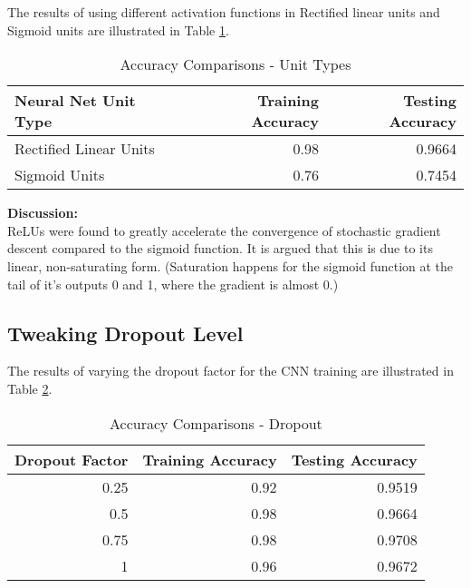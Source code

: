 \documentclass[parskip=half]{scrartcl}
\begin{document}
        The results of using different activation functions in Rectified linear units and Sigmoid units are illustrated in Table \ref{tab:accuracy_comparisons_unit_types}.

        \begin{table}[th]
            \centering
            \begin{tabular}{| l | r | r |}
            \hline
            \textbf{Neural Net Unit Type} & \textbf{Training Accuracy} & \textbf{Testing Accuracy} \\
            \hline
                \hline
                Rectified Linear Units & 0.98 & 0.9664 \\
                \hline
                Sigmoid Units & 0.76 & 0.7454 \\
            \hline
            \end{tabular}
            \caption{Accuracy Comparisons - Unit Types}
            \label{tab:accuracy_comparisons_unit_types}
        \end{table}

        \textbf{Discussion:}\\
        ReLUs were found to greatly accelerate the convergence of stochastic gradient descent compared to the sigmoid function. It is argued that this is due to its linear, non-saturating form. (Saturation happens for the sigmoid function at the tail of it's outputs 0 and 1, where the gradient is almost 0.)
    

    \subsection{Tweaking Dropout Level} %
    \label{sub:tweaking_dropout_level}

        The results of varying the dropout factor for the CNN training are illustrated in Table \ref{tab:accuracy_comparisons_dropout}.

        \begin{table}[th]
            \centering
            \begin{tabular}{| r | r | r |}
            \hline
            \textbf{Dropout Factor} & \textbf{Training Accuracy} & \textbf{Testing Accuracy} \\
            \hline
                \hline
                0.25 & 0.92 & 0.9519 \\
                \hline
                0.5 & 0.98 & 0.9664 \\
                \hline
                0.75 & 0.98 & 0.9708 \\
                \hline
                1 & 0.96 & 0.9672 \\
            \hline
            \end{tabular}
            \caption{Accuracy Comparisons - Dropout}
            \label{tab:accuracy_comparisons_dropout}
        \end{table}
\end{document}
